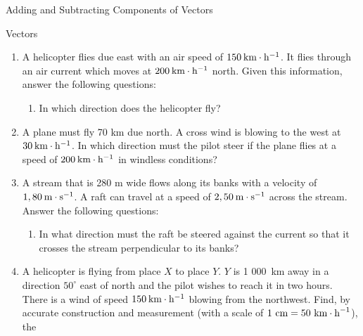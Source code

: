 \begin{exercises}{Adding and Subtracting Components of Vectors}
\begin{eocexercises}{Vectors}
\begin{enumerate}[noitemsep, label=\textbf{\arabic*}.]
            \label{m38819*uid118}\item A helicopter flies due east with an air speed of $150\phantom{\rule{2pt}{0ex}}\text{km}\ensuremath{\cdot}\text{h}{}^{-1}$. It flies through an air current which moves at $200\phantom{\rule{2pt}{0ex}}\text{km}\ensuremath{\cdot}\text{h}{}^{-1}$ north. Given this information, answer the following questions:
\label{m38819*id198203}\begin{enumerate}[noitemsep, label=\textbf{\alph*}. ] 
            \label{m38819*uid119}\item In which direction does the helicopter fly?
\end{enumerate}
                \label{m38819*uid122}\item A plane must fly 70 km due north. A cross wind is blowing to the west at $30\phantom{\rule{2pt}{0ex}}\text{km}\ensuremath{\cdot}\text{h}{}^{-1}$. In which direction must the pilot steer if the plane flies at a speed of $200\phantom{\rule{2pt}{0ex}}\text{km}\ensuremath{\cdot}\text{h}{}^{-1}$ in windless conditions?\newline
\label{m38819*uid123}\item A stream that is 280 m wide flows along its banks with a velocity of $1,80\phantom{\rule{2pt}{0ex}}\text{m}\ensuremath{\cdot}\text{s}{}^{-1}$. A raft can travel at a speed of $2,50\phantom{\rule{2pt}{0ex}}\text{m}\ensuremath{\cdot}\text{s}{}^{-1}$ across the stream. Answer the following questions:
\label{m38819*id198337}\begin{enumerate}[noitemsep, label=\textbf{\alph*}. ] 
\label{m38819*uid126}\item In what direction must the raft be steered against the current so that it crosses the stream perpendicular to its banks?
\end{enumerate}
                \label{m38819*uid128}\item A helicopter is flying from place $X$ to place $Y$. $Y$ is 1 000~km away in a direction ${50}^{\circ }$ east of north and the pilot wishes to reach it in two hours. There is a wind of speed $150\phantom{\rule{2pt}{0ex}}\text{km}\ensuremath{\cdot}\text{h}{}^{-1}$ blowing from the northwest. Find, by accurate construction and measurement (with a scale of $1\phantom{\rule{3.33333pt}{0ex}}\text{cm}=50\phantom{\rule{3.33333pt}{0ex}}{\text{km}\ensuremath{\cdot}\text{h}}^{-1}$), the

\end{enumerate}
\end{eocexercises}
\end{exercises}
